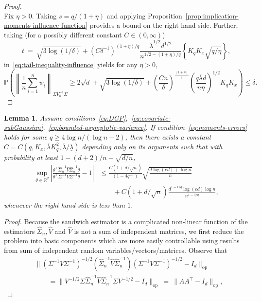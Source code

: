 \documentclass[11pt]{article}
\newtheorem{lemma}[theorem]{Lemma}
\begin{document}
\begin{appendices}
\begin{proof}
\[\]
Fix $\eta > 0$. Taking $s = q/(1 + \eta)$ and applying Proposition~\ref{prop:implication-moments-influence-function} provides a bound on the right hand side. Further, taking (for a possibly different constant $C\in(0,\infty)$)
\[
t ~=~ \sqrt{3\log(1/\delta)} + (C\delta^{-1})^{(1 + \eta)/q}\frac{\overline{\lambda}^{1/2}d^{1/2}}{n^{1/2 - (1 + \eta)/q}}\left\{K_qK_x\sqrt{q/\eta}\right\},
\] 
in~\eqref{eq:tail-inequality-influence} yields for any $\eta > 0$,
\[
\mathbb{P}\left(\left\|\frac{1}{n}\sum_{i=1}^n \psi_i\right\|_{\Sigma V_n^{-1}\Sigma} \ge 2\sqrt{d} + \sqrt{3\log(1/\delta)} + \left(\frac{Cn}{\delta}\right)^{\frac{(1+\eta)}{q}}\left(\frac{q\overline{\lambda}d}{n\eta}\right)^{1/2}K_qK_x\right) \le \delta.
\]
\end{proof}
\begin{lemma}\label{lem:std-err-consistency}
Assume conditions~\ref{eq:DGP},~\ref{eq:covariate-subGaussian},~\ref{eq:bounded-asymptotic-variance}. If condition~\ref{eq:moments-errors} holds for some $q \ge 4\log n/(\log n - 2)$, then there exists a constant $C = C(q, K_x, \overline{\lambda} K_q^2, \overline{\lambda}/\underline{\lambda})$ depending only on its arguments such that with probability at least $1 - (d+2)/n - \sqrt{d/n}$,
\begin{align*}
\sup_{\theta\in\mathbb{R}^d}\left|\frac{\theta^{\top}\widehat{\Sigma}_n^{-1}\widehat{V}\widehat{\Sigma}_n^{-1}\theta}{\theta^{\top}\Sigma^{-1}V\Sigma^{-1}\theta} - 1\right| &\le \frac{C(1 + d/\sqrt{n})}{(1-4q^{-1})}\sqrt{\frac{d\log(ed) + \log n}{n}}\\ &\qquad+ C(1 + d/\sqrt{n})\frac{d^{1-1/q}\log(ed)\log n}{n^{1-3/q}},
\end{align*}
whenever the right hand side is less than $1$.
\end{lemma}
\begin{proof}
Because the sandwich estimator is a complicated non-linear function of the estimators $\widehat{\Sigma}_n, \widehat{V}$ and $\widehat{V}$ is not a sum of independent matrices, we first reduce the problem into basic components which are more easily controllable using results from sum of independent random variables/vectors/matrices.
Observe that
\begin{align*}
&\|(\Sigma^{-1}V\Sigma^{-1})^{-1/2}(\widehat{\Sigma}_n^{-1}\widehat{V}\widehat{\Sigma}_n^{-1})(\Sigma^{-1}V\Sigma^{-1})^{-1/2} - I_d\|_{\mathrm{op}}\\
&\qquad= \|V^{-1/2}\Sigma\widehat{\Sigma}_n^{-1}\widehat{V}\widehat{\Sigma}_n^{-1}\Sigma V^{-1/2} - I_d\|_{\mathrm{op}} ~=~ \|AA^{\top} - I_d\|_{\mathrm{op}},

\end{align*}
\end{proof}
\end{appendices}
\end{document}
